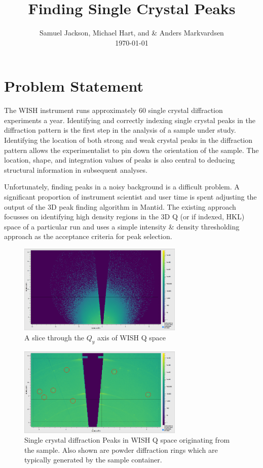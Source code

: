 \documentclass[paper=a4, fontsize=8pt]{scrartcl} \usepackage[T1]{fontenc}
\title{
		\huge Finding Single Crystal Peaks \\
}
\author{
		\normalfont 								\normalsize
        Samuel Jackson, Michael Hart, and \& Anders Markvardsen \\[-3pt]		\normalsize
        \today
}
\date{}
\begin{document}
 
\maketitle

\section{Problem Statement} 
The WISH instrument runs approximately 60 single
crystal diffraction experiments a year. Identifying and correctly indexing
single crystal peaks in the diffraction pattern is the first step in the analysis
of a sample under study.  Identifying the location of both strong and weak
crystal peaks in the diffraction pattern allows the experimentalist to pin down
the orientation of the sample. The location, shape, and integration values of peaks is also central
to deducing structural information in subsequent analyses.

Unfortunately, finding peaks in a noisy background is a difficult problem.  A
significant proportion of instrument scientist and user time is spent adjusting
the output of the 3D peak finding algorithm in Mantid. The existing approach
focusses on identifying high density regions in the 3D Q (or if indexed, HKL) 
space of a particular run and uses a simple intensity \& density thresholding approach as the 
acceptance criteria for peak selection.

\begin{figure}[H]
\centering
\includegraphics[width=0.7\textwidth]{WISH28145_4.png}
\caption{A slice through the $Q_y$ axis of WISH Q space}
\label{fig:wish-q-space}
\end{figure}

\begin{figure}[H]
\centering
\includegraphics[width=0.7\textwidth]{WISH28145_2.png}
\caption{Single crystal diffraction Peaks in WISH Q space originating from the 
    sample. Also shown are powder diffraction
    rings which are typically generated by the sample container.}
\label{fig:wish-peaks}
\end{figure}
\end{document}
